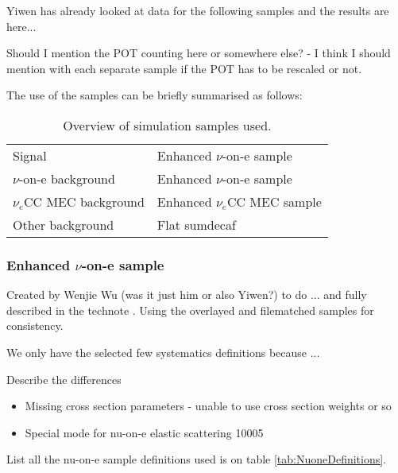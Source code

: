 Yiwen has already looked at data for the following samples and the results are here...

Should I mention the POT counting here or somewhere else? - I think I should mention with each separate sample if the POT has to be rescaled or not.

The use of the samples can be briefly summarised as follows:
\begin{table}[!ht]
\centering
\def\arraystretch{1.4}
\begin{tabular}{l@{\hskip 1in}l}
Signal                   & Enhanced $\nu$-on-e sample\\
$\nu$-on-e background    & Enhanced $\nu$-on-e sample\\
$\nu_e$CC MEC background & Enhanced $\nu_e$CC MEC sample\\
Other background         & Flat sumdecaf
\end{tabular}
\caption{Overview of simulation samples used.}
\label{tab:DefinitionsOverview}
\end{table}

\subsubsection*{Enhanced $\nu$-on-e sample}
Created by Wenjie Wu (was it just him or also Yiwen?) to do ... and fully described in the technote \cite{NOVA-doc-56383}. Using the overlayed and filematched samples for consistency.

We only have the selected few systematics definitions because ... 

Describe the differences
\begin{itemize}
\item Missing cross section parameters - unable to use cross section weights or so
\item Special mode for nu-on-e elastic scattering 10005
\end{itemize}

List all the nu-on-e sample definitions used is on table \ref{tab:NuoneDefinitions}.

